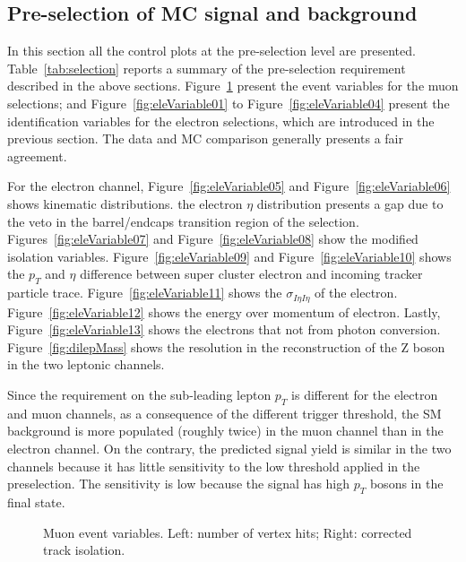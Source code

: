 \documentclass[12pt]{article} %
\begin{document}
\subsection{Pre-selection of MC signal and background} %

In this section all the control plots at the pre-selection level are presented. Table~\ref{tab:selection} reports a summary of the pre-selection requirement described in the above sections. Figure~\ref{fig:muVariable} present the event variables for the muon selections; and Figure~\ref{fig:eleVariable01} to Figure~\ref{fig:eleVariable04} present the identification variables for the electron selections, which are introduced in the previous section. The data and MC comparison generally presents a fair agreement. 

For the electron channel, Figure~\ref{fig:eleVariable05} and Figure~\ref{fig:eleVariable06} shows kinematic distributions. the electron $\eta$ distribution presents a gap due to the veto in the barrel/endcaps transition region of the selection. Figures~\ref{fig:eleVariable07} and Figure~\ref{fig:eleVariable08} show the modified isolation variables. Figure~\ref{fig:eleVariable09} and Figure~\ref{fig:eleVariable10} shows the $p_T$ and $\eta$ difference between super cluster electron and incoming tracker particle trace. Figure~\ref{fig:eleVariable11} shows the $\sigma_{I\eta I\eta}$ of the electron. Figure~\ref{fig:eleVariable12} shows the energy over momentum of electron. Lastly, Figure~\ref{fig:eleVariable13} shows the electrons that not from photon conversion. Figure~\ref{fig:dilepMass} shows the resolution in the reconstruction of the Z boson in the two leptonic channels. 

Since the requirement on the sub-leading lepton $p_T$ is different for the electron and muon channels, as a consequence of the different trigger threshold, the SM background is more populated (roughly twice) in the muon channel than in the electron channel. On the contrary, the predicted signal yield is similar in the two channels because it has little sensitivity to the low threshold applied in the preselection. The sensitivity is low because the signal has high $p_T$ bosons in the final state.


\begin{figure}[H] %
  \caption{Muon event variables. Left: number of vertex hits; Right: corrected track isolation.}
  \label{fig:muVariable}
\end{figure}
\end{document}
